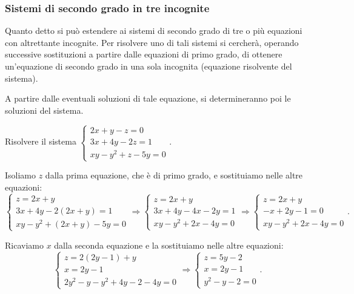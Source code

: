 \subsubsection{Sistemi di secondo grado in tre incognite}
Quanto detto si può estendere ai sistemi di secondo grado di tre o più equazioni con altrettante incognite. Per risolvere uno di tali sistemi si cercherà, operando successive sostituzioni a partire dalle equazioni di primo grado, di ottenere un'equazione di secondo grado in una sola incognita (equazione risolvente del sistema).

A partire dalle eventuali soluzioni di tale equazione, si determineranno poi le soluzioni del sistema.
\newpage
\begin{exrig}
\begin{esempio}
Risolvere il sistema $\left\{\begin{array}{l}2x+y-z=0\\3x+4y-2z=1\\xy-y^2+z-5y=0\end{array}\right.$.

Isoliamo $ z $ dalla prima equazione, che è di primo grado, e sostituiamo nelle altre equazioni: 
\[ \left\{\begin{array}{l}z=2x+y\\
3x+4y-2(2x+y)=1\\
{xy}-y^2+(2x+y)-5y=0\end{array}\right. \Rightarrow\left\{\begin{array}{l}z=2x+y\\
3x+4y-4x-2y=1\\
xy-y^2+2x-4y=0\end{array}\right. \Rightarrow\left\{\begin{array}{l}z=2x+y\\
-x+2y-1=0\\
xy-y^2+2x-4y=0\end{array}\right..\]

Ricaviamo $ x $ dalla seconda equazione e la sostituiamo nelle altre equazioni: 
\[ \left\{\begin{array}{l}z=2(2y-1)+y\\
x=2y-1\\
2y^2-y-y^2+4y-2-4y=0\end{array}\right. \Rightarrow\left\{\begin{array}{l}z=5y-2\\
x=2y-1\\
y^2-y-2=0\end{array}\right..\]


\end{esempio}
\end{exrig}

